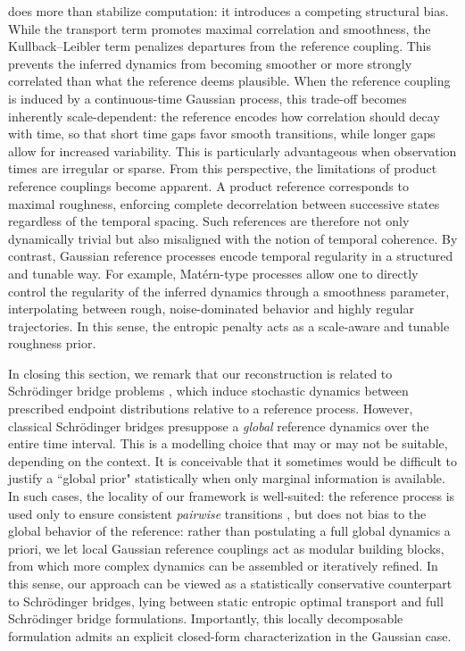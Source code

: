 \documentclass[]{article}
\numberwithin{equation}{section}
\theoremstyle{plain}
\begin{document}
{does more than stabilize computation: it introduces a competing structural bias. While the transport term promotes maximal correlation and smoothness, the Kullback--Leibler term penalizes departures from the reference coupling. This prevents the inferred dynamics from becoming smoother or more strongly correlated than what the reference deems plausible. When the reference coupling is induced by a continuous-time Gaussian process, this trade-off becomes inherently scale-dependent: the reference encodes how correlation should decay with time, so that short time gaps favor smooth transitions, while longer gaps allow for increased variability. This is particularly advantageous when observation times are irregular or sparse. From this perspective, the limitations of product reference couplings become apparent. A product reference corresponds to maximal roughness, enforcing complete decorrelation between successive states regardless of the temporal spacing. Such references are therefore not only dynamically trivial but also misaligned with the notion of temporal coherence. By contrast, Gaussian reference processes encode temporal regularity in a structured and tunable way. For example, Mat\'ern-type processes allow one to directly control the regularity of the inferred dynamics through a smoothness parameter, interpolating between rough, noise-dominated behavior and highly regular trajectories. In this sense, the entropic penalty acts as a scale-aware and tunable roughness prior.

In closing this section, we remark that our reconstruction is related to Schr\"odinger bridge problems \cite{leonardsurveySchrodinger2013, bernton2019schr, pavon2021data, hong2025trajectory}, which induce stochastic dynamics between prescribed endpoint distributions relative to a reference process. However, classical Schr\"odinger bridges presuppose a \emph{global} reference dynamics over the entire time interval. This is a modelling choice that may or may not be suitable, depending on the context. It is conceivable that it sometimes would be difficult to justify a ``global prior" statistically when only marginal information is available. In such cases, the locality of our framework is well-suited: the reference process is used only to ensure consistent \emph{pairwise} transitions%
, but does not bias to the global behavior of the reference: rather than postulating a full global dynamics a priori, we let local Gaussian reference couplings act as modular building blocks, from which more complex dynamics can be assembled or iteratively refined. In this sense, our approach can be viewed as a statistically conservative counterpart to Schr\"odinger bridges, lying between static entropic optimal transport and full Schrödinger bridge formulations. Importantly, this locally decomposable formulation admits an explicit closed-form characterization in the Gaussian case. 

}
\end{document}
